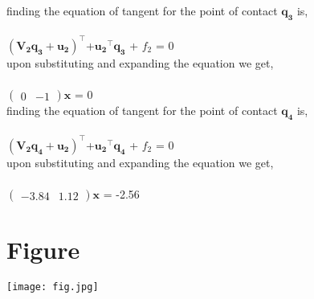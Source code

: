 \documentclass[journal,12pt,twocolumn]{IEEEtran}
\newcommand{\myvec}[1]{\ensuremath{\begin{pmatrix}#1\end{pmatrix}}}
\let\vec\mathbf
\begin{document}
finding the equation of tangent for the point of contact $\vec{q_3}$ is, \\ \\
\hspace*{2cm}$(\vec{V_2}\vec{q_3}+\vec{u_2})^{\top}$+$\vec{u_2}^{\top}\vec{q_3}$ + $f_2$ = 0 \\

upon substituting and expanding the equation we get, \\ \\
\hspace*{2cm}$\myvec{0 & -1}\vec{x}$ = 0 \\

finding the equation of tangent for the point of contact $\vec{q_4}$ is, \\ \\
\hspace*{2cm}$(\vec{V_2}\vec{q_4}+\vec{u_2})^{\top}$+$\vec{u_2}^{\top}\vec{q_4}$ + $f_2$ = 0 \\

upon substituting and expanding the equation we get, \\ \\
\hspace*{2cm}$\myvec{-3.84 & 1.12}\vec{x}$ = -2.56 \\



\section{\large{Figure}}
\texttt{[image: fig.jpg]}
\label{fig:Figure}
\end{document}
